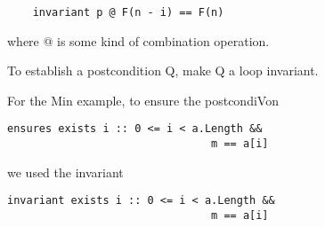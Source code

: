 \begin{verbatim}
    invariant p @ F(n - i) == F(n)
\end{verbatim}
where @ is some kind of combination operation.

To establish a postcondition Q, make Q a loop
invariant.

For the Min example, to ensure the postcondiVon
\begin{verbatim}
ensures exists i :: 0 <= i < a.Length && 
                                m == a[i]
\end{verbatim}
we used the invariant
\begin{verbatim}
invariant exists i :: 0 <= i < a.Length && 
                                m == a[i]
\end{verbatim}